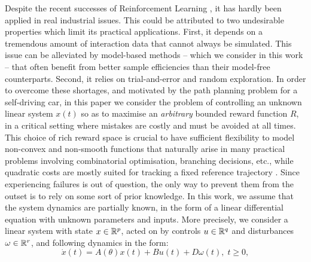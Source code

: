 \documentclass{article}
\begin{document}
Despite the recent successes of Reinforcement Learning \citep[e.g.][]{mnih2015humanlevel,Silver1140}, it has hardly been applied in real industrial issues. This could be attributed to two undesirable properties which limit its practical applications. First, it depends on a tremendous amount of interaction data that cannot always be simulated. This issue can be alleviated by model-based methods -- which we consider in this work -- that often benefit from better sample efficiencies than their model-free counterparts. Second, it relies on trial-and-error and random exploration. In order to overcome these shortages, and motivated by the path planning problem for a self-driving car, in this paper we consider the problem of controlling an unknown linear system $x(t)$ so as to maximise an \emph{arbitrary} bounded reward function $R$, in a critical setting where mistakes are costly and must be avoided at all times. 
This choice of rich reward space is crucial to have sufficient flexibility to model non-convex and non-smooth functions that naturally arise in many practical problems involving combinatorial optimisation, branching decisions, etc., while quadratic costs are mostly suited for tracking a fixed reference trajectory \citep[e.g.][]{Kumar2013}.
Since experiencing failures is out of question, the only way to prevent them from the outset is to rely on some sort of prior knowledge. In this work, we assume that the system dynamics are partially known, in the form of a linear differential equation with unknown parameters and inputs. More precisely, we consider a linear system with state $x\in\mathbb{R}^p$, acted on by controls $u\in\mathbb{R}^q$ and disturbances $\omega\in\mathbb{R}^r$, and following dynamics in the form:
\begin{equation}
\label{eq:dynamics}
\dot{x}(t)=A(\theta)x(t) + B u(t) + D \omega(t),\;t\geq0,
\end{equation}
\end{document}
